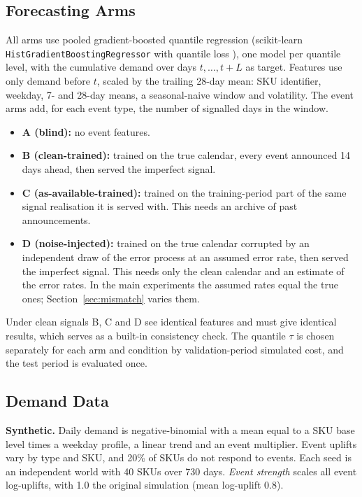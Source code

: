 \subsection{Forecasting Arms}
All arms use pooled gradient-boosted quantile regression (scikit-learn \texttt{HistGradientBoostingRegressor} with quantile loss \cite{pedregosa2011sklearn}), one model per quantile level, with the cumulative demand over days $t,\dots,t+L$ as target. Features use only demand before $t$, scaled by the trailing 28-day mean: SKU identifier, weekday, 7- and 28-day means, a seasonal-naive window and volatility. The event arms add, for each event type, the number of signalled days in the window.
\begin{itemize}
    \item \textbf{A (blind):} no event features.
    \item \textbf{B (clean-trained):} trained on the true calendar, every event announced 14 days ahead, then served the imperfect signal.
    \item \textbf{C (as-available-trained):} trained on the training-period part of the same signal realisation it is served with. This needs an archive of past announcements.
    \item \textbf{D (noise-injected):} trained on the true calendar corrupted by an independent draw of the error process at an assumed error rate, then served the imperfect signal. This needs only the clean calendar and an estimate of the error rates. In the main experiments the assumed rates equal the true ones; Section~\ref{sec:mismatch} varies them.
\end{itemize}
Under clean signals B, C and D see identical features and must give identical results, which serves as a built-in consistency check. The quantile $\tau$ is chosen separately for each arm and condition by validation-period simulated cost, and the test period is evaluated once.

\subsection{Demand Data}
\textbf{Synthetic.} Daily demand is negative-binomial with a mean equal to a SKU base level times a weekday profile, a linear trend and an event multiplier. Event uplifts vary by type and SKU, and 20\% of SKUs do not respond to events. Each seed is an independent world with 40 SKUs over 730 days. \emph{Event strength} scales all event log-uplifts, with 1.0 the original simulation (mean log-uplift 0.8).

